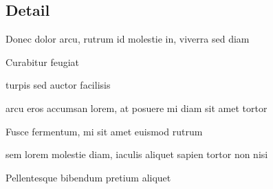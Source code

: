 \subsection{Detail}

\begin{compactitem}
	\item Donec dolor arcu, rutrum id molestie in, viverra sed diam
	\item Curabitur feugiat
	\item turpis sed auctor facilisis
	\item arcu eros accumsan lorem, at posuere mi diam sit amet tortor
	\item Fusce fermentum, mi sit amet euismod rutrum
	\item sem lorem molestie diam, iaculis aliquet sapien tortor non nisi
	\item Pellentesque bibendum pretium aliquet
\end{compactitem}
\lipsum[4] %

